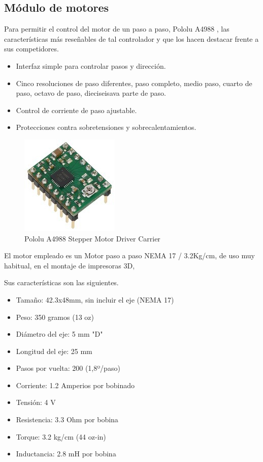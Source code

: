 \subsection{Módulo de motores}

Para permitir el control del motor de un paso a paso,  Pololu A4988 \cite{pololu},
las características más reseñables de tal controlador y que los hacen destacar frente a sus competidores.

\begin{itemize}
	\item Interfaz simple para controlar pasos y dirección.
	\item Cinco resoluciones de paso diferentes, paso completo, medio paso, cuarto de paso, octavo de paso, dieciseisava parte de paso. 
	\item Control de corriente de paso ajustable.
	\item Protecciones contra sobretensiones y sobrecalentamientos.
\end{itemize}


\begin{figure}[h]
\centering
\includegraphics[width=0.3\linewidth]{../images/pololu}
\caption{Pololu A4988 Stepper Motor Driver Carrier}
\label{fig:pololu}
\end{figure}

\newpage

El motor empleado es un Motor paso a paso NEMA 17 / 3.2Kg/cm, de uso muy habitual, 
en el montaje de impresoras 3D,  

\bigskip
Sus características son las siguientes.

\begin{itemize}
\item Tamaño: 42.3x48mm, sin incluir el eje (NEMA 17)
\item Peso: 350 gramos (13 oz)
\item Diámetro del eje: 5 mm "D"
\item Longitud del eje: 25 mm
\item Pasos por vuelta: 200 (1,8º/paso)
\item Corriente: 1.2 Amperios por bobinado
\item Tensión: 4 V
\item Resistencia: 3.3 Ohm por bobina
\item Torque: 3.2 kg/cm (44 oz-in)
\item Inductancia: 2.8 mH por bobina 
\end{itemize}

